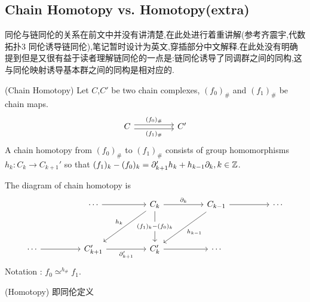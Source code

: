 \documentclass{article}
\begin{document}
\subsection{ Chain Homotopy vs. Homotopy(extra)}
同伦与链同伦的关系在前文中并没有讲清楚,在此处进行着重讲解(参考齐震宇,代数拓扑3 同伦诱导链同伦),笔记暂时设计为英文,穿插部分中文解释.在此处没有明确提到但是又很有益于读者理解链同伦的一点是:链同伦诱导了同调群之间的同构,这与同伦映射诱导基本群之间的同构是相对应的.
\begin{definition}
    (Chain Homotopy) Let $C$,$C'$ be two chain complexes, $(f_0)_\#$ and $(f_1)_\#$ be chain maps.
    \[\begin{tikzcd}
        C && {C'}
        \arrow["{(f_0)_\#}", shift left, from=1-1, to=1-3]
        \arrow["{(f_1)_\#}"', shift right, from=1-1, to=1-3]
    \end{tikzcd}\]
    A chain homotopy from $(f_0)_\#$ to $(f_1)_\#$ consists of group homomorphisms $h_k: C_k\to C_{k+1}'$ so that $(f_1)_k - (f_0)_k = \partial_{k+1}'h_k + h_{k-1}\partial_k , k \in \mathbb{Z}$.
\end{definition}
The diagram of chain homotopy is 
\[\begin{tikzcd}
	&& \cdots && {C_k} && {C_{k-1}} && \cdots \\
	\\
	\cdots && {C_{k+1}'} && {C_k'} && \cdots
	\arrow["{\partial_{k+1}'}"', from=3-3, to=3-5]
	\arrow["{h_k}"', from=1-5, to=3-3]
	\arrow["{h_{k-1}}", from=1-7, to=3-5]
	\arrow["{\partial_k}", from=1-5, to=1-7]
	\arrow["{(f_1)_k - (f_0)_k}"{description}, from=1-5, to=3-5]
	\arrow[from=1-7, to=1-9]
	\arrow[from=1-3, to=1-5]
	\arrow[from=3-1, to=3-3]
	\arrow[from=3-5, to=3-7]
\end{tikzcd}\]
Notation : $f_0 \simeq^{h_\#}f_1$.

\begin{definition}
    (Homotopy) 即同伦定义
\end{definition}
\end{document}
